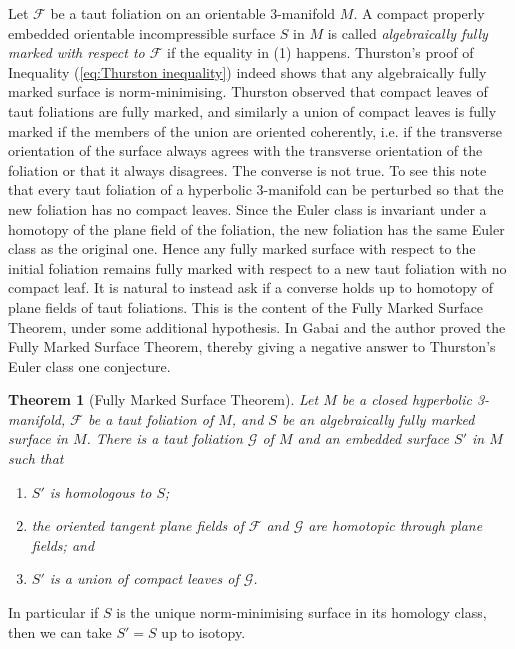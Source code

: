 \documentclass[11pt]{amsart}
\newtheorem{thm}{Theorem}[section]
\theoremstyle{remark}
\theoremstyle{definition}
\begin{document}
	Let $\mathcal{F}$ be a taut foliation on an orientable 3-manifold $M$.  A compact properly embedded orientable incompressible surface $S$ in $M$ is called \emph{algebraically fully marked with respect to $\mathcal{F}$} if the equality in (1) happens. Thurston's proof of Inequality (\ref{eq:Thurston inequality}) indeed shows that any algebraically fully marked surface is norm-minimising. Thurston observed that compact leaves of taut foliations are fully marked, and similarly a union of compact leaves is fully marked if the members of the union are oriented coherently, i.e. if the transverse orientation of the surface always agrees with the transverse orientation of the foliation or that it always disagrees. The converse is not true. To see this note that every taut foliation of a hyperbolic 3-manifold can be perturbed so that the new foliation has no compact leaves. Since the Euler class is invariant under a homotopy of the plane field of the foliation, the new foliation has the same Euler class as the original one. Hence any fully marked surface with respect to the initial foliation remains fully marked with respect to a new taut foliation with no compact leaf. It is natural to instead ask if a converse holds up to homotopy of plane fields of taut foliations. This is the content of the Fully Marked Surface Theorem, under some additional hypothesis. In \cite{gabai2020fullymarked} Gabai and the author proved the Fully Marked Surface Theorem, thereby giving a negative answer to Thurston's Euler class one conjecture. 
	 
	 \begin{thm}[Fully Marked Surface Theorem]
	 	Let $M$ be a closed hyperbolic 3-manifold, $\mathcal{F}$ be a taut foliation of $M$, and $S$ be an algebraically fully marked surface in $M$. There is a taut foliation $\mathcal{G}$ of $M$ and an embedded surface $S'$ in $M$ such that 
	 	\begin{enumerate}
	 		\item $S'$ is homologous to $S$; 
	 		\item the oriented tangent plane fields of $\mathcal{F}$ and $\mathcal{G}$ are homotopic through plane fields; and 
	 		\item $S'$ is a  union of compact leaves of $\mathcal{G}$.
	 	\end{enumerate} 
	 	\label{thm:fully marked surface}
	 \end{thm}
 
	In particular if $S$ is the unique norm-minimising surface in its homology class, then we can take $S' = S$ up to isotopy. 
 	
\end{document}
